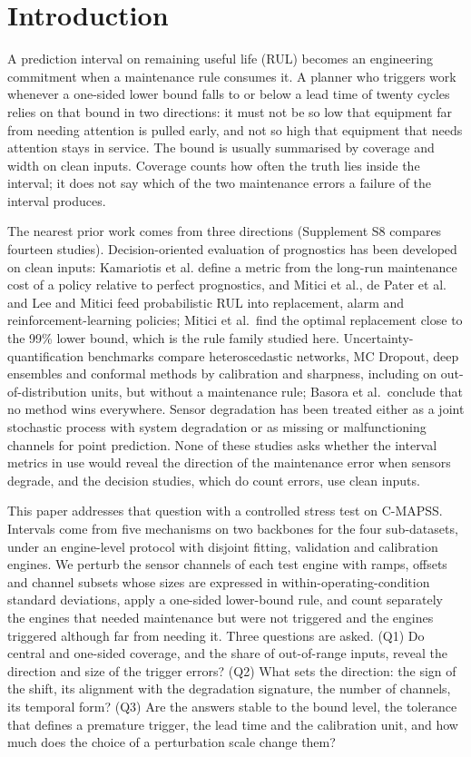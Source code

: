 \section{Introduction}
A prediction interval on remaining useful life (RUL) becomes an engineering commitment when a maintenance rule consumes it. A planner who triggers work whenever a one-sided lower bound falls to or below a lead time of twenty cycles relies on that bound in two directions: it must not be so low that equipment far from needing attention is pulled early, and not so high that equipment that needs attention stays in service. The bound is usually summarised by coverage and width on clean inputs. Coverage counts how often the truth lies inside the interval; it does not say which of the two maintenance errors a failure of the interval produces.

The nearest prior work comes from three directions (Supplement S8 compares fourteen studies). Decision-oriented evaluation of prognostics has been developed on clean inputs: Kamariotis et al.\cite{kamariotis2024} define a metric from the long-run maintenance cost of a policy relative to perfect prognostics, and Mitici et al.\cite{mitici2023}, de Pater et al.\cite{depater2022} and Lee and Mitici\cite{lee2022} feed probabilistic RUL into replacement, alarm and reinforcement-learning policies; Mitici et al.\ find the optimal replacement close to the 99\% lower bound, which is the rule family studied here. Uncertainty-quantification benchmarks compare heteroscedastic networks, MC Dropout, deep ensembles and conformal methods by calibration and sharpness, including on out-of-distribution units,\cite{basora2025,piao2025,xu2026,javanmardi2022} but without a maintenance rule; Basora et al.\ conclude that no method wins everywhere. Sensor degradation has been treated either as a joint stochastic process with system degradation\cite{hachem2024} or as missing or malfunctioning channels for point prediction.\cite{xu2023,tang2026} None of these studies asks whether the interval metrics in use would reveal the direction of the maintenance error when sensors degrade, and the decision studies, which do count errors, use clean inputs.

This paper addresses that question with a controlled stress test on C-MAPSS. Intervals come from five mechanisms on two backbones for the four sub-datasets, under an engine-level protocol with disjoint fitting, validation and calibration engines. We perturb the sensor channels of each test engine with ramps, offsets and channel subsets whose sizes are expressed in within-operating-condition standard deviations, apply a one-sided lower-bound rule, and count separately the engines that needed maintenance but were not triggered and the engines triggered although far from needing it. Three questions are asked. (Q1) Do central and one-sided coverage, and the share of out-of-range inputs, reveal the direction and size of the trigger errors? (Q2) What sets the direction: the sign of the shift, its alignment with the degradation signature, the number of channels, its temporal form? (Q3) Are the answers stable to the bound level, the tolerance that defines a premature trigger, the lead time and the calibration unit, and how much does the choice of a perturbation scale change them?

